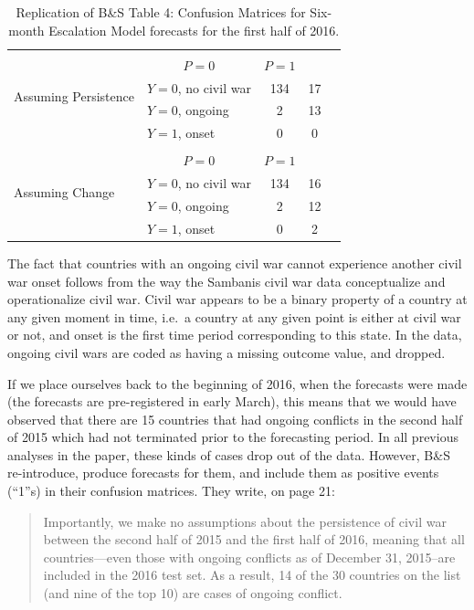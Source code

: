 \documentclass[
]{article}
\begin{document}
\begin{table}
\caption{Replication of B\&S Table 4: Confusion Matrices for Six-month Escalation Model forecasts for the first half of 2016.}\label{tab:table4}
\centering
\begin{tabular}{ll|c|c|l}
\multicolumn{1}{l}{\multirow{5}{*}{Assuming Persistence}} & \multicolumn{3}{c}{} \\
\multicolumn{2}{c}{}& \multicolumn{1}{c}{$P=0$} & \multicolumn{1}{c}{$P=1$} \\
\cline{3-4}
& $Y=0$, no civil war & 134 & 17 \\
\cline{3-4}
& $Y=0$, ongoing & 2 & 13 \\
\cline{3-4}
& $Y=1$, onset & 0 & 0 \\
\cline{3-4}
\multicolumn{1}{l}{\multirow{5}{*}{Assuming Change}} & \multicolumn{3}{c}{} \\
\multicolumn{2}{c}{}& \multicolumn{1}{c}{$P=0$} & \multicolumn{1}{c}{$P=1$} \\
\cline{3-4}
& $Y=0$, no civil war & 134 & 16 \\
\cline{3-4}
& $Y=0$, ongoing & 2 & 12 \\
\cline{3-4}
& $Y=1$, onset & 0 & 2 \\
\cline{3-4}
\end{tabular}
\end{table}

The fact that countries with an ongoing civil war cannot experience another civil war onset follows from the way the Sambanis civil war data conceptualize and operationalize civil war. Civil war appears to be a binary property of a country at any given moment in time, i.e.~a country at any given point is either at civil war or not, and onset is the first time period corresponding to this state. In the data, ongoing civil wars are coded as having a missing outcome value, and dropped.

If we place ourselves back to the beginning of 2016, when the forecasts were made (the forecasts are pre-registered in early March), this means that we would have observed that there are 15 countries that had ongoing conflicts in the second half of 2015 which had not terminated prior to the forecasting period. In all previous analyses in the paper, these kinds of cases drop out of the data. However, B\&S re-introduce, produce forecasts for them, and include them as positive events (``1''s) in their confusion matrices. They write, on page 21:

\begin{quote}
Importantly, we make no assumptions about the persistence of civil war between the second half of 2015 and the first half of 2016, meaning that all countries---even those with ongoing conflicts as of December 31, 2015--are included in the 2016 test set. As a result, 14 of the 30 countries on the list (and nine of the top 10) are cases of ongoing conflict.
\end{quote}
\end{document}

